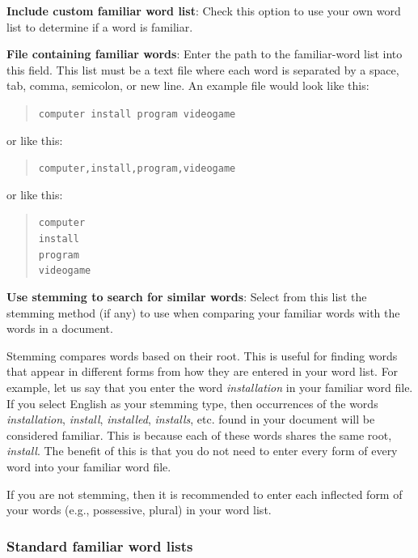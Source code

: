 \documentclass[
]{book}
\theoremstyle{definition}
\theoremstyle{definition}
\theoremstyle{definition}
\theoremstyle{definition}
\theoremstyle{remark}
\begin{document}
\textbf{Include custom familiar word list}: Check this option to use your own word list to determine if a word is familiar.

\textbf{File containing familiar words}: Enter the path to the familiar-word list into this field. This list must be a text file where each word is separated by a space, tab, comma, semicolon, or new line. An example file would look like this:

\begin{quote}
\texttt{computer\ install\ program\ videogame}
\end{quote}

or like this:

\begin{quote}
\texttt{computer,install,program,videogame}
\end{quote}

or like this:

\begin{quote}
\texttt{computer}~\\
\texttt{install}~\\
\texttt{program}~\\
\texttt{videogame}
\end{quote}

\textbf{Use stemming to search for similar words}: Select from this list the stemming method (if any) to use when comparing your familiar words with the words in a document.

Stemming compares words based on their root. This is useful for finding words that appear in different forms from how they are entered in your word list. For example, let us say that you enter the word \emph{installation} in your familiar word file. If you select English as your stemming type, then occurrences of the words \emph{installation}, \emph{install}, \emph{installed}, \emph{installs}, etc. found in your document will be considered familiar. This is because each of these words shares the same root, \emph{install}. The benefit of this is that you do not need to enter every form of every word into your familiar word file.

If you are not stemming, then it is recommended to enter each inflected form of your words (e.g., possessive, plural) in your word list.

\hypertarget{standard-familiar-word-lists}{%
\subsubsection*{Standard familiar word lists}\label{standard-familiar-word-lists}}
\end{document}
